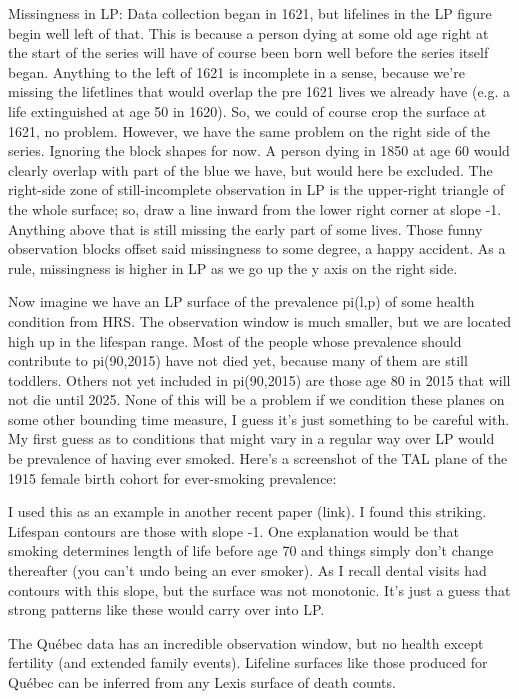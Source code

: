 \documentclass{bmcart}
\begin{document}
\begin{small}
Missingness in LP:
Data collection began in 1621, but lifelines in the LP figure begin well left of that. This is because a person dying at some old age right at the start of the series will have of course been born well before the series itself began. Anything to the left of 1621 is incomplete in a sense, because we're missing the lifetlines that would overlap the pre 1621 lives we already have (e.g. a life extinguished at age 50 in 1620). So, we could of course crop the surface at 1621, no problem. However, we have the same problem on the right side of the series. Ignoring the block shapes for now.  A person dying in 1850 at age 60 would clearly overlap with part of the blue we have, but would here be excluded. The right-side zone of still-incomplete observation in LP is the upper-right triangle of the whole surface; so, draw a line inward from the lower right corner at slope -1. Anything above that is still missing the early part of some lives. Those funny observation blocks offset said missingness to some degree, a happy accident. As a rule, missingness is higher in LP as we go up the y axis on the right side.

Now imagine we have an LP surface of the prevalence pi(l,p) of some health condition from HRS. The observation window is much smaller, but we are located high up in the lifespan range. Most of the people whose prevalence should contribute to  pi(90,2015) have not died yet, because many of them are still toddlers. Others not yet included in  pi(90,2015) are those age 80 in 2015 that will not die until 2025. None of this will be a problem if we condition these planes on some other bounding time measure, I guess it's just something to be careful with. My first guess as to conditions that might vary in a regular way over LP would be prevalence of having ever smoked. Here's a screenshot of the TAL plane of the 1915 female birth cohort for ever-smoking prevalence:

I used this as an example in another recent paper (link). I found this striking. Lifespan contours are those with slope -1. One explanation would be that smoking determines length of life before age 70 and things simply don't change thereafter (you can't undo being an ever smoker). As I recall dental visits had contours with this slope, but the surface was not monotonic. It's just a guess that strong patterns like these would carry over into LP.

The Qu\'{e}bec data has an incredible observation window, but no health except fertility (and extended family events). Lifeline surfaces like those produced for Qu\'{e}bec can be inferred from any Lexis surface of death counts.
\end{small}
\end{document}
